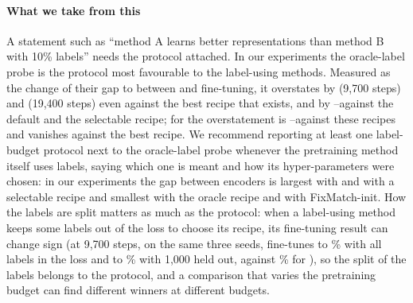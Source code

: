 \paragraph{What we take from this}
A statement such as ``method A learns better representations than method B with 10\% labels'' needs the
protocol attached. In our experiments the oracle-label probe is the protocol most favourable to the
label-using methods. Measured as the change of their gap to \simclr between \lpall and fine-tuning, it
overstates \union by \pt (9,700 steps) and \pt (19,400 steps) even against
the best recipe that exists, and by --\pt against the default and the
selectable recipe; for \supcon the overstatement is --\pt against these
recipes and vanishes against the best recipe. We recommend
reporting at least one label-budget protocol next to the oracle-label probe whenever the pretraining method
itself uses labels, saying which one is meant and how its hyper-parameters were chosen: in our experiments the
gap between encoders is largest with \lpfive and \ftfive with a selectable recipe and smallest with the oracle
recipe and with FixMatch-init. How the labels are split matters as much as the protocol: when a label-using
method keeps some labels out of the loss to choose its recipe, its fine-tuning result can change sign
(at 9,700 steps, on the same three seeds, \supcon fine-tunes to \% with all labels
in the loss and to \% with 1,000 held out, against \% for
\simclr), so the split of the labels belongs to the protocol, and a
comparison that varies the pretraining budget can find different winners at different budgets.
